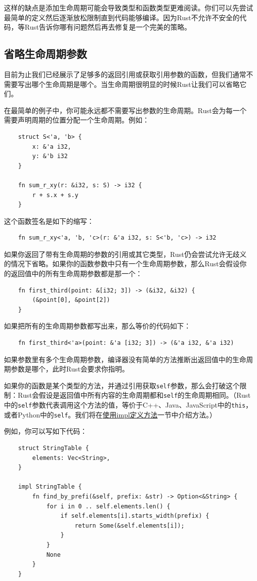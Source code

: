 这样的缺点是添加生命周期可能会导致类型和函数类型更难阅读。你们可以先尝试最简单的定义然后逐渐放松限制直到代码能够编译。因为Rust不允许不安全的代码，等Rust告诉你哪有问题然后再去修复是一个完美的策略。

\subsection{省略生命周期参数}\label{OmitLifeTime}
目前为止我们已经展示了足够多的返回引用或获取引用参数的函数，但我们通常不需要写出哪个生命周期是哪个。当生命周期很明显的时候Rust让我们可以省略它们。

在最简单的例子中，你可能永远都不需要写出参数的生命周期。Rust会为每一个需要声明周期的位置分配一个生命周期。例如：
\begin{verbatim}
    struct S<'a, 'b> {
        x: &'a i32,
        y: &'b i32
    }

    fn sum_r_xy(r: &i32, s: S) -> i32 {
        r + s.x + s.y
    }
\end{verbatim}

这个函数签名是如下的缩写：
\begin{verbatim}
    fn sum_r_xy<'a, 'b, 'c>(r: &'a i32, s: S<'b, 'c>) -> i32
\end{verbatim}

如果你返回了带有生命周期的参数的引用或其它类型，Rust仍会尝试允许无歧义的情况下省略。如果你的函数参数中只有一个生命周期参数，那么Rust会假设你的返回值中的所有生命周期参数都是那一个：
\begin{verbatim}
    fn first_third(point: &[i32; 3]) -> (&i32, &i32) {
        (&point[0], &point[2])
    }
\end{verbatim}

如果把所有的生命周期参数都写出来，那么等价的代码如下：
\begin{verbatim}
    fn first_third<'a>(point: &'a [i32; 3]) -> (&'a i32, &'a i32)
\end{verbatim}

如果参数里有多个生命周期参数，编译器没有简单的方法推断出返回值中的生命周期参数是哪个，此时Rust会要求你指明。

如果你的函数是某个类型的方法，并通过引用获取\texttt{self}参数，那么会打破这个限制：Rust会假设是返回值中所有内容的生命周期都和\texttt{self}的生命周期相同。（Rust中的\texttt{self}参数代表调用这个方法的值，等价于C++、Java、JavaScript中的\texttt{this}，或者Python中的\texttt{self}。我们将在\hyperref[method]{使用impl定义方法}一节中介绍方法。）

例如，你可以写如下代码：
\begin{verbatim}
    struct StringTable {
        elements: Vec<String>,
    }

    impl StringTable {
        fn find_by_prefi(&self, prefix: &str) -> Option<&String> {
            for i in 0 .. self.elements.len() {
                if self.elements[i].starts_width(prefix) {
                    return Some(&self.elements[i]);
                }
            }
            None
        }
    }
\end{verbatim}

